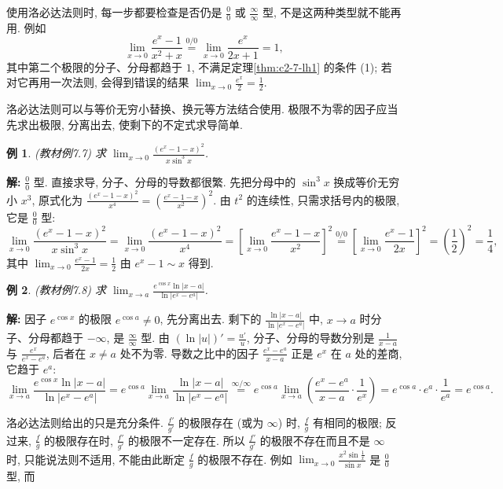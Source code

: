 \documentclass[UTF8,openany]{ctexbook}
\theoremstyle{chinesetextbook}
\newtheorem{example}{例}[section]
\newenvironment{cnsolution}{\par\indent\textbf{解:} \ignorespaces}{\par}
\begin{document}
使用洛必达法则时, 每一步都要检查是否仍是 $\displaystyle\frac00$ 或 $\displaystyle\frac\infty\infty$ 型, 不是这两种类型就不能再用. 例如
\[
\lim_{x\to0}\frac{e^x-1}{x^2+x}\overset{0/0}{=}\lim_{x\to0}\frac{e^x}{2x+1}=1,
\]
其中第二个极限的分子、分母都趋于 $1$, 不满足定理\ref{thm:c2-7-lh1} 的条件 (1); 若对它再用一次法则, 会得到错误的结果 $\displaystyle\lim_{x\to0}\frac{e^x}2=\frac12$.

洛必达法则可以与等价无穷小替换、换元等方法结合使用. 极限不为零的因子应当先求出极限, 分离出去, 使剩下的不定式求导简单.
\begin{example}\label{ex:c2-7-7}
\textnormal{(教材例7.7)} 求 $\displaystyle\lim_{x\to0}\frac{(e^x-1-x)^2}{x\sin^3x}$.
\end{example}
\begin{cnsolution}
$\displaystyle\frac00$ 型. 直接求导, 分子、分母的导数都很繁. 先把分母中的 $\sin^3x$ 换成等价无穷小 $x^3$, 原式化为 $\displaystyle\frac{(e^x-1-x)^2}{x^4}=\left(\frac{e^x-1-x}{x^2}\right)^2$. 由 $t^2$ 的连续性, 只需求括号内的极限, 它是 $\displaystyle\frac00$ 型:
\[
\lim_{x\to0}\frac{(e^x-1-x)^2}{x\sin^3x}=\lim_{x\to0}\frac{(e^x-1-x)^2}{x^4}=\left[\lim_{x\to0}\frac{e^x-1-x}{x^2}\right]^2\overset{0/0}{=}\left[\lim_{x\to0}\frac{e^x-1}{2x}\right]^2=\left(\frac12\right)^2=\frac14,
\]
其中 $\displaystyle\lim_{x\to0}\frac{e^x-1}{2x}=\frac12$ 由 $e^x-1\sim x$ 得到.
\end{cnsolution}
\begin{example}\label{ex:c2-7-8}
\textnormal{(教材例7.8)} 求 $\displaystyle\lim_{x\to a}\frac{e^{\cos x}\ln|x-a|}{\ln|e^x-e^a|}$.
\end{example}
\begin{cnsolution}
因子 $e^{\cos x}$ 的极限 $e^{\cos a}\ne0$, 先分离出去. 剩下的 $\displaystyle\frac{\ln|x-a|}{\ln|e^x-e^a|}$ 中, $x\to a$ 时分子、分母都趋于 $-\infty$, 是 $\displaystyle\frac\infty\infty$ 型. 由 $\displaystyle(\ln|u|)'=\frac{u'}u$, 分子、分母的导数分别是 $\displaystyle\frac1{x-a}$ 与 $\displaystyle\frac{e^x}{e^x-e^a}$, 后者在 $x\ne a$ 处不为零. 导数之比中的因子 $\displaystyle\frac{e^x-e^a}{x-a}$ 正是 $e^x$ 在 $a$ 处的差商, 它趋于 $e^a$:
\[
\lim_{x\to a}\frac{e^{\cos x}\ln|x-a|}{\ln|e^x-e^a|}=e^{\cos a}\lim_{x\to a}\frac{\ln|x-a|}{\ln|e^x-e^a|}\overset{\infty/\infty}{=}e^{\cos a}\lim_{x\to a}\left(\frac{e^x-e^a}{x-a}\cdot\frac1{e^x}\right)=e^{\cos a}\cdot e^a\cdot\frac1{e^a}=e^{\cos a}.
\]
\end{cnsolution}
洛必达法则给出的只是充分条件. $\displaystyle\frac{f'}{g'}$ 的极限存在 (或为 $\infty$) 时, $\displaystyle\frac fg$ 有相同的极限; 反过来, $\displaystyle\frac fg$ 的极限存在时, $\displaystyle\frac{f'}{g'}$ 的极限不一定存在. 所以 $\displaystyle\frac{f'}{g'}$ 的极限不存在而且不是 $\infty$ 时, 只能说法则不适用, 不能由此断定 $\displaystyle\frac fg$ 的极限不存在. 例如 $\displaystyle\lim_{x\to0}\frac{x^2\sin\frac1x}{\sin x}$ 是 $\displaystyle\frac00$ 型, 而
\end{document}
